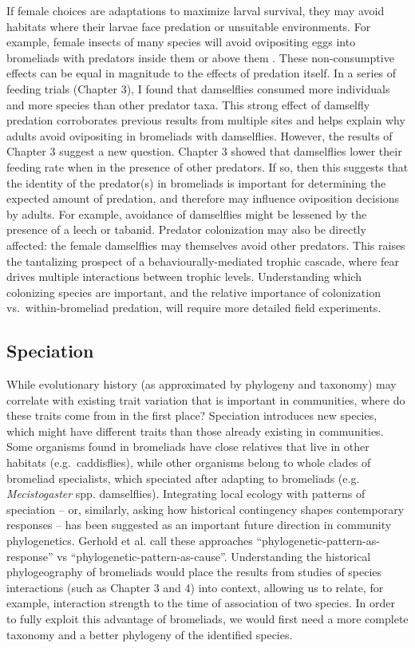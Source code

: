 If female choices are adaptations to maximize larval survival, they may
avoid habitats where their larvae face predation or unsuitable
environments. For example, female insects of many species will avoid
ovipositing eggs into bromeliads with predators inside them
\citep{Hammill2015} or above them \citep{Romero2010}. These
non-consumptive effects can be equal in magnitude to the effects of
predation itself. In a series of feeding trials (Chapter 3), I found
that damselflies consumed more individuals and more species than other
predator taxa. This strong effect of damselfly predation corroborates
previous results from multiple sites \citep{Petermann2015a} and helps explain why
adults avoid ovipositing in bromeliads with damselflies. However, the
results of Chapter 3 suggest a new question. Chapter 3 showed that
damselflies lower their feeding rate when in the presence of other
predators. If so, then this suggests that the identity of the
predator(s) in bromeliads is important for determining the expected
amount of predation, and therefore may influence oviposition decisions
by adults. For example, avoidance of damselflies might be lessened by
the presence of a leech or tabanid. Predator colonization may also be
directly affected: the female damselflies may themselves avoid other
predators. This raises the tantalizing prospect of a
behaviourally-mediated trophic cascade, where fear drives multiple
interactions between trophic levels. Understanding which colonizing
species are important, and the relative importance of colonization
vs.~within-bromeliad predation, will require more detailed field
experiments.

\subsection{Speciation}\label{speciation}

While evolutionary history (as approximated by phylogeny and taxonomy)
may correlate with existing trait variation that is important in
communities, where do these traits come from in the first place?
Speciation introduces new species, which might have different traits
than those already existing in communities. Some organisms found in
bromeliads have close relatives that live in other habitats
(e.g.~caddisflies), while other organisms belong to whole clades of
bromeliad specialists, which speciated after adapting to bromeliads
(e.g. \emph{Mecistogaster} spp. damselflies). Integrating local ecology
with patterns of speciation -- or, similarly, asking how historical
contingency shapes contemporary responses -- has been suggested as an
important future direction in community phylogenetics.
Gerhold et al. \citet{Gerhold2015} call these approaches
``phylogenetic-pattern-as-response'' vs
``phylogenetic-pattern-as-cause''. Understanding the historical
phylogeography of bromeliads would place the results from studies of
species interactions (such as Chapter 3 and 4) into context, allowing us
to relate, for example, interaction strength to the time of association
of two species. In order to fully exploit this advantage of bromeliads,
we would first need a more complete taxonomy and a better phylogeny of
the identified species.

